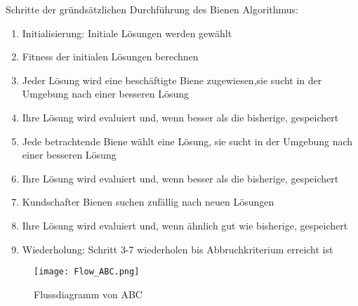 Schritte der gründsätzlichen Durchführung des Bienen Algorithmus:
\begin{enumerate}
  \item Initialisierung: Initiale Lösungen werden gewählt 
  \item Fitness der initialen Lösungen berechnen
  \item Jeder Lösung wird eine beschäftigte Biene zugewiesen,sie sucht in der Umgebung nach einer besseren Lösung
  \item Ihre Lösung wird evaluiert und, wenn besser als die bisherige, gespeichert
  \item Jede betrachtende Biene wählt eine Lösung, sie sucht in der Umgebung nach einer besseren Lösung
  \item Ihre Lösung wird evaluiert und, wenn besser als die bisherige, gespeichert
  \item Kundschafter Bienen suchen zufällig nach neuen Lösungen
  \item Ihre Lösung wird evaluiert und, wenn ähnlich gut wie bisherige, gespeichert
  \item Wiederholung: Schritt 3-7 wiederholen bis Abbruchkriterium erreicht ist
\end{enumerate}


\begin{figure}
  \centering
  \texttt{[image: Flow\_ABC.png]}
  \caption{Flussdiagramm von ABC}
  \label{fig:Figure_ABC}
\end{figure}
